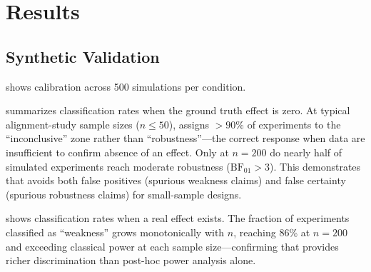 \section{Results}
\label{sec:results}

\subsection{Synthetic Validation}
\label{sec:results:synthetic}

 shows \ours calibration across 500 simulations per condition.

 summarizes classification rates when the ground truth
effect is zero. At typical alignment-study sample sizes ($n \leq 50$), \ours assigns
$> 90\%$ of experiments to the ``inconclusive'' zone rather than ``robustness''---the
correct response when data are insufficient to confirm absence of an effect.
Only at $n = 200$ do nearly half of simulated experiments reach moderate robustness
($\mathrm{BF}_{01} > 3$). This demonstrates that \ours avoids both false positives
(spurious weakness claims) and false certainty (spurious robustness claims) for
small-sample designs.

\begin{table}[t]
\centering
\caption{Synthetic validation: classification rates when true effect $\delta = 0$.
\ours requires $n \geq 100$ before regularly indicating moderate robustness.}
\label{tab:synthetic_null}
\end{table}

 shows classification rates when a real effect exists.
The fraction of experiments classified as ``weakness'' grows monotonically with $n$,
reaching 86\% at $n = 200$ and exceeding classical power at each sample size---confirming
that \ours provides richer discrimination than post-hoc power analysis alone.

